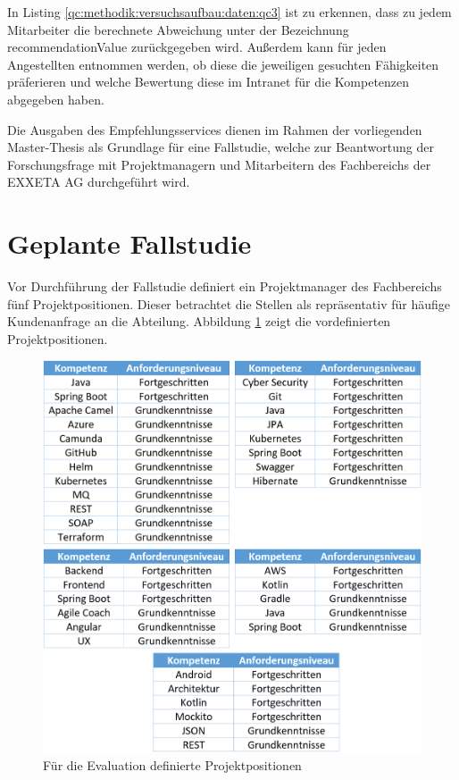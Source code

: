 In Listing \ref{qc:methodik:versuchsaufbau:daten:qc3} ist zu erkennen, dass zu jedem Mitarbeiter die berechnete Abweichung unter der Bezeichnung recommendationValue zurückgegeben wird. Außerdem kann für jeden Angestellten entnommen werden, ob diese die jeweiligen gesuchten Fähigkeiten präferieren und welche Bewertung diese im Intranet für die Kompetenzen abgegeben haben.

Die Ausgaben des Empfehlungsservices dienen im Rahmen der vorliegenden Master-Thesis als Grundlage für eine Fallstudie, welche zur Beantwortung der Forschungsfrage mit Projektmanagern und Mitarbeitern des Fachbereichs \JES der EXXETA AG durchgeführt wird.

\section{Geplante Fallstudie}
\label{ch:methodik:evaluation}
Vor Durchführung der Fallstudie definiert ein Projektmanager des Fachbereichs \JES fünf Projektpositionen. Dieser betrachtet die Stellen als repräsentativ für häufige Kundenanfrage an die Abteilung. Abbildung \ref{fig:methodik:evaluation:abb2} zeigt die vordefinierten Projektpositionen.

\begin{figure}[h]
	\centering
	\includegraphics[width=1.0\textwidth]{gfx/Projekt.png}
	\caption{Für die Evaluation definierte Projektpositionen}
	\label{fig:methodik:evaluation:abb2}
\end{figure}

